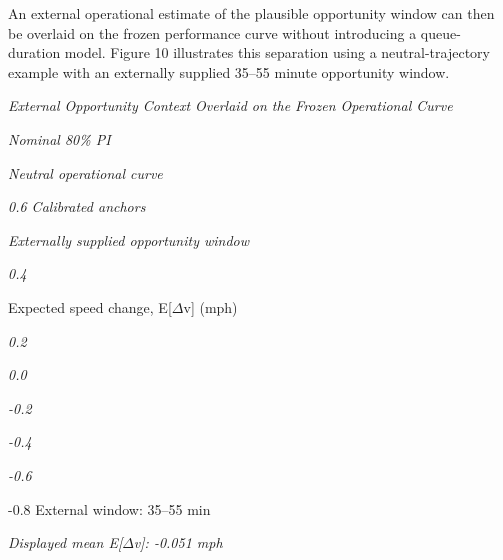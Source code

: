 An external operational estimate of the plausible opportunity window can then be overlaid on the frozen performance curve without introducing a queue-duration model. Figure 10 illustrates this separation using a neutral-trajectory example with an externally supplied 35--55 minute opportunity window.

\begin{center}\textit{External Opportunity Context Overlaid on the Frozen Operational Curve}\end{center}

\begin{center}\textit{Nominal 80\% PI}\end{center}

\begin{center}\textit{Neutral operational curve}\end{center}

\begin{center}\textit{0.6                                                       Calibrated anchors}\end{center}

\begin{center}\textit{Externally supplied opportunity window}\end{center}

\begin{center}\textit{0.4}\end{center}

Expected speed change, E[\ensuremath{\Delta}v] (mph)

\begin{center}\textit{0.2}\end{center}

\begin{center}\textit{0.0}\end{center}

\begin{center}\textit{-0.2}\end{center}

\begin{center}\textit{-0.4}\end{center}

\begin{center}\textit{-0.6}\end{center}

-0.8 External window: 35--55 min

\begin{center}\textit{Displayed mean E[\ensuremath{\Delta}v]: -0.051 mph}\end{center}

